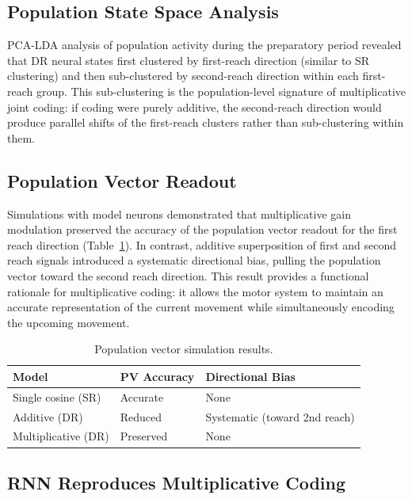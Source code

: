 \documentclass[12pt]{article}
\begin{document}
\subsection{Population State Space Analysis}

PCA-LDA analysis of population activity during the preparatory period revealed that DR neural states first clustered by first-reach direction (similar to SR clustering) and then sub-clustered by second-reach direction within each first-reach group. This sub-clustering is the population-level signature of multiplicative joint coding: if coding were purely additive, the second-reach direction would produce parallel shifts of the first-reach clusters rather than sub-clustering within them.

\subsection{Population Vector Readout}

Simulations with model neurons demonstrated that multiplicative gain modulation preserved the accuracy of the population vector readout for the first reach direction (Table~\ref{tab:pv}). In contrast, additive superposition of first and second reach signals introduced a systematic directional bias, pulling the population vector toward the second reach direction. This result provides a functional rationale for multiplicative coding: it allows the motor system to maintain an accurate representation of the current movement while simultaneously encoding the upcoming movement.

\begin{table}[ht]
\centering
\caption{Population vector simulation results.}
\label{tab:pv}
\begin{tabular}{lll}
\toprule
Model & PV Accuracy & Directional Bias \\
\midrule
Single cosine (SR) & Accurate & None \\
Additive (DR) & Reduced & Systematic (toward 2nd reach) \\
Multiplicative (DR) & Preserved & None \\
\bottomrule
\end{tabular}
\end{table}

\subsection{RNN Reproduces Multiplicative Coding}
\end{document}
